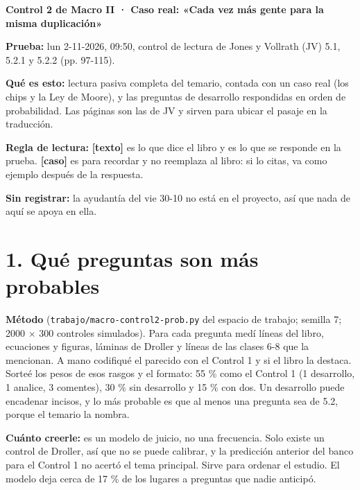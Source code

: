 \documentclass[11pt,a4paper]{article}
\begin{document}
\begin{center}{\LARGE\bfseries Control 2 de Macro II · Caso real: «Cada vez más gente para la misma duplicación»}\end{center}

\textbf{Prueba:} lun 2-11-2026, 09:50, control de lectura de Jones y Vollrath (JV) 5.1, 5.2.1 y 5.2.2 (pp. 97-115).

\textbf{Qué es esto:} lectura pasiva completa del temario, contada con un caso real (los chips y la Ley de Moore), y las preguntas de desarrollo respondidas en orden de probabilidad. Las páginas son las de JV y sirven para ubicar el pasaje en la traducción.

\textbf{Regla de lectura:} \textbf{[texto]} es lo que dice el libro y es lo que se responde en la prueba. \textbf{[caso]} es para recordar y no reemplaza al libro: si lo citas, va como ejemplo después de la respuesta.

\textbf{Sin registrar:} la ayudantía del vie 30-10 no está en el proyecto, así que nada de aquí se apoya en ella.

\section*{1. Qué preguntas son más probables}

\textbf{Método} (\texttt{trabajo/macro-control2-prob.py} del espacio de trabajo; semilla 7; 2000 $\times$ 300 controles simulados). Para cada pregunta medí líneas del libro, ecuaciones y figuras, láminas de Droller y líneas de las clases 6-8 que la mencionan. A mano codifiqué el parecido con el Control 1 y si el libro la destaca. Sorteé los pesos de esos rasgos y el formato: 55 \% como el Control 1 (1 desarrollo, 1 analice, 3 comentes), 30 \% sin desarrollo y 15 \% con dos. Un desarrollo puede encadenar incisos, y lo más probable es que al menos una pregunta sea de 5.2, porque el temario la nombra.

\textbf{Cuánto creerle:} es un modelo de juicio, no una frecuencia. Solo existe un control de Droller, así que no se puede calibrar, y la predicción anterior del banco para el Control 1 no acertó el tema principal. Sirve para ordenar el estudio. El modelo deja cerca de 17 \% de los lugares a preguntas que nadie anticipó.
\end{document}
